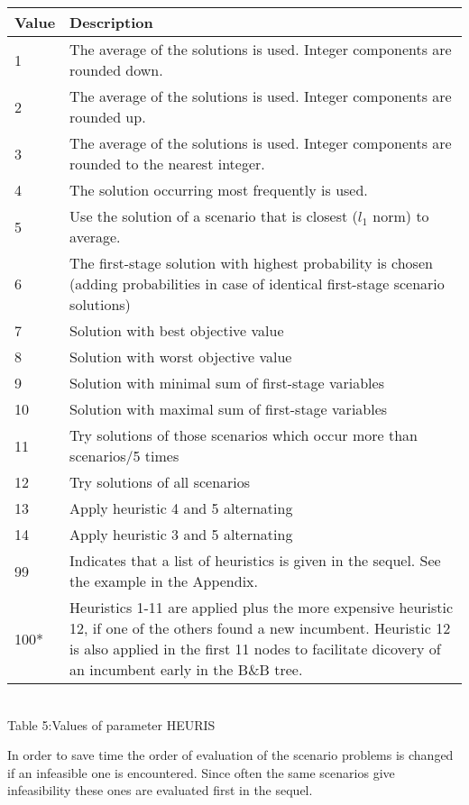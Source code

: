 \documentclass[11pt,draft]{article}
\newcommand{\+}{{\ti{+}}}
\newcommand{\1}{{\ti{1}}}
\begin{document}
\begin{center}
\begin{tabular}{|lp{11.2cm}|} 
\hline
Value&Description\\ \hline
1&The average of the solutions is used. Integer components are rounded down.\medskip\\
2&The average of the solutions is used. Integer components are rounded up.\medskip\\
3&The average of the solutions is used. Integer components are rounded to the
nearest integer.\medskip\\
4&The solution occurring most frequently is used.\medskip\\
5&Use the solution of a scenario that is closest ($l_1$ norm) to average.\medskip\\
6&The first-stage solution with highest probability is chosen (adding probabilities in case of identical first-stage scenario solutions)\medskip\\
7&Solution with best objective value\medskip\\
8&Solution with worst objective value\medskip\\
9&Solution with minimal sum of first-stage variables\medskip\\
10&Solution with maximal sum of first-stage variables\medskip\\
11&Try solutions of those scenarios which occur more than scenarios/5 times\medskip\\
12&Try solutions of all scenarios\medskip\\
13&Apply heuristic 4 and 5 alternating\medskip\\
14&Apply heuristic 3 and 5 alternating\medskip\\
99&Indicates that a list of heuristics is given in the sequel. See the example in the Appendix.\\
100*&Heuristics 1-11 are applied plus the more expensive heuristic 12, if one of the others found a new incumbent. Heuristic 12 is also applied in the first 11 nodes to facilitate dicovery of an incumbent early in the B\&B tree.\\
\hline
\end{tabular}
\\[0.5em]Table 5:\quad Values of parameter HEURIS\\
\end{center} %
%
\setcounter{table}{4}
%
In order to save time the order of evaluation of the scenario problems is changed if an infeasible one is encountered.
Since often the same scenarios give infeasibility these ones are evaluated first in the sequel.
\end{document}
